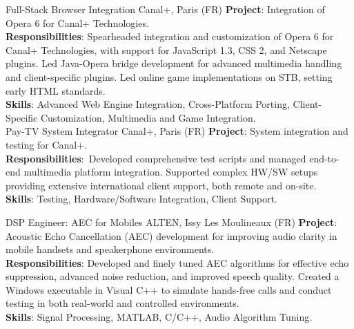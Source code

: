 \documentclass[
  a4paper,
   maincolor=cvblue,
   sectioncolor=cvblue,
]{fortysecondscv}
\begin{document}
\begin{cvtable}
    {Full-Stack Browser Integration}
    {Canal+,  Paris (FR)}
    {
      \textbf{Project}: Integration of Opera 6 for Canal+ Technologies.\\
      \textbf{Responsibilities}:
          Spearheaded integration and customization of Opera 6 for Canal+ Technologies, with support for JavaScript 1.3, CSS 2, and Netscape plugins. Led Java-Opera bridge development for advanced multimedia handling and client-specific plugins. Led online game implementations on STB, setting early HTML standards.\\
      \textbf{Skills}: Advanced Web Engine Integration, Cross-Platform Porting, Client-Specific Customization, Multimedia and Game Integration.\\
    }
    {Pay-TV System Integrator}
    {Canal+,  Paris (FR)}
    {
      \textbf{Project}: System integration and testing for Canal+.\\
      \textbf{Responsibilities}:\
          Developed comprehensive test scripts and managed end-to-end multimedia platform integration.
          Supported complex HW/SW setups providing extensive international client support, both remote and on-site.\\
      \textbf{Skills}: Testing, Hardware/Software Integration, Client Support.\\
    }

    {DSP Engineer: AEC for Mobiles}
    {ALTEN, Issy Les Moulineaux (FR)}
    {
      \textbf{Project}: Acoustic Echo Cancellation (AEC) development for improving audio clarity in mobile handsets and speakerphone environments.\\
      \textbf{Responsibilities}:
          Developed and finely tuned AEC algorithms for effective echo suppression, advanced noise reduction, and improved speech quality. Created a Windows executable in Visual C++ to simulate hands-free calls and conduct testing in both real-world and controlled environments.\\
      \textbf{Skills}: Signal Processing, MATLAB, C/C++, Audio Algorithm Tuning.
    }


\end{cvtable}
\end{document}
